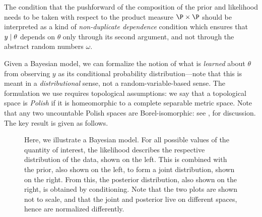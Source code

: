\documentclass[11pt]{book}
\begin{document}
The condition that the pushforward of the composition of the prior and likelihood needs to be taken with respect to the product measure $\P\x\P$ should be interpreted as a kind of \emph{non-duplicate dependence} condition which ensures that $y\mid\theta$ depends on $\theta$ only through its second argument, and not through the abstract random numbers $\omega$.

Given a Bayesian model, we can formalize the notion of what is \emph{learned} about $\theta$ from observing $y$ as its conditional probability distribution---note that this is meant in a \emph{distributional} sense, not a random-variable-based sense.
The formulation we use requires topological assumptions: we say that a topological space is \emph{Polish} if it is homeomorphic to a complete separable metric space.
Note that any two uncountable Polish spaces are Borel-isomorphic: see \textcite[5]{villani08}, for discussion.
The key result is given as follows.

\begin{figure}
\begin{subfigure}{0.55\textwidth}

\end{subfigure}
\begin{subfigure}{0.44\textwidth}
\tikzset{external/export next=false}
\end{subfigure}
\caption[Bayesian models]{Here, we illustrate a Bayesian model. For all possible values of the quantity of interest, the likelihood describes the respective distribution of the data, shown on the left. This is combined with the prior, also shown on the left, to form a joint distribution, shown on the right. From this, the posterior distribution, also shown on the right, is obtained by conditioning. Note that the two plots are shown not to scale, and that the joint and posterior live on different spaces, hence are normalized differently.}
\label{fig:bayes-rule}
\end{figure}
\end{document}

